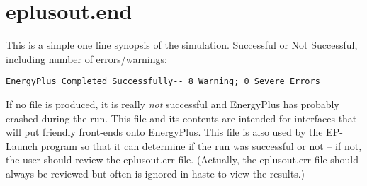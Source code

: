 \section{eplusout.end}

This is a simple one line synopsis of the simulation. Successful or Not Successful, including number of errors/warnings:

\begin{lstlisting}
EnergyPlus Completed Successfully-- 8 Warning; 0 Severe Errors
\end{lstlisting}

If no file is produced, it is really \emph{not} successful and EnergyPlus has probably crashed during the run. This file and its contents are intended for interfaces that will put friendly front-ends onto EnergyPlus. This file is also used by the EP-Launch program so that it can determine if the run was successful or not – if not, the user should review the eplusout.err file. (Actually, the eplusout.err file should always be reviewed but often is ignored in haste to view the results.)
